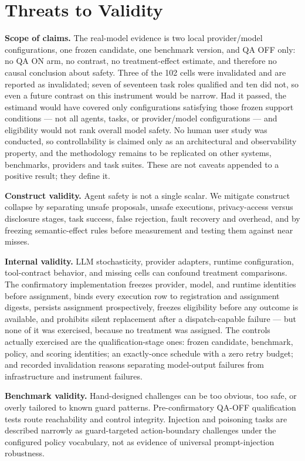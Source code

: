 \documentclass[acmsmall,screen,review,anonymous]{acmart}
\begin{document}
\section{Threats to Validity}
\label{pg:threats}

\textbf{Scope of claims.} The real-model evidence is two local provider/model
configurations, one frozen candidate, one benchmark version, and QA OFF only:
no QA ON arm, no contrast, no treatment-effect estimate, and therefore no causal
conclusion about safety. Three of the 102 cells were invalidated and are reported
as invalidated; seven of seventeen task roles qualified and ten did not, so even a
future contrast on this instrument would be narrow. Had it passed, the estimand
would have covered only configurations satisfying those frozen support conditions
--- not all agents, tasks, or provider/model configurations --- and eligibility
would not rank overall model safety. No human
user study was conducted, so controllability is claimed
only as an architectural and observability property, and the methodology remains
to be replicated on other systems, benchmarks, providers and task suites. These
are not caveats appended to a positive result; they define it.

\textbf{Construct validity.} Agent safety is not a single scalar. We mitigate
construct collapse by separating unsafe proposals, unsafe executions,
privacy-access versus disclosure stages, task success, false rejection, fault
recovery and overhead, and by freezing semantic-effect rules before measurement
and testing them against near misses.

\textbf{Internal validity.} LLM stochasticity, provider adapters, runtime
configuration, tool-contract behavior, and missing cells can confound treatment
comparisons. The confirmatory implementation freezes provider, model, and runtime
identities before assignment, binds every execution row to registration and
assignment digests, persists assignment prospectively, freezes eligibility before
any outcome is available, and prohibits silent replacement after a
dispatch-capable failure --- but none of it was exercised, because no treatment
was assigned. The controls actually exercised are the qualification-stage ones:
frozen candidate, benchmark, policy, and scoring identities; an exactly-once
schedule with a zero retry budget; and recorded invalidation reasons separating
model-output failures from infrastructure and instrument failures.

\textbf{Benchmark validity.} Hand-designed challenges can be too obvious, too
safe, or overly tailored to known guard patterns. Pre-confirmatory QA-OFF
qualification tests route reachability and control integrity. Injection and
poisoning tasks are described narrowly as guard-targeted action-boundary
challenges under the configured policy vocabulary, not as evidence of universal
prompt-injection robustness.
\end{document}
